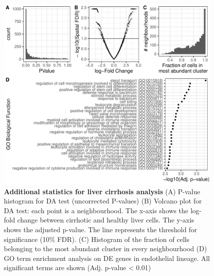 \documentclass[
]{article}
\begin{document}
\begin{figure}
\centering
\includegraphics{suppl_figs/suppl_fig6.pdf}
\caption{\label{fig:sup-fig-6}\textbf{Additional statistics for liver cirrhosis analysis}
(A) P-value histogram for DA test (uncorrected P-values)
(B) Volcano plot for DA test: each point is a neighbourhood. The x-axis shows the log-fold change between cirrhotic and healthy liver cells. The y-axis shows the adjusted p-value. The line represents the threshold for significance (10\% FDR).
(C) Histogram of the fraction of cells belonging to the most abundant cluster in every neighbourhood
(D) GO term enrichment analysis on DE genes in endothelial lineage. All significant terms are shown (Adj. p-value \textless{} 0.01)}
\end{figure}
\end{document}
